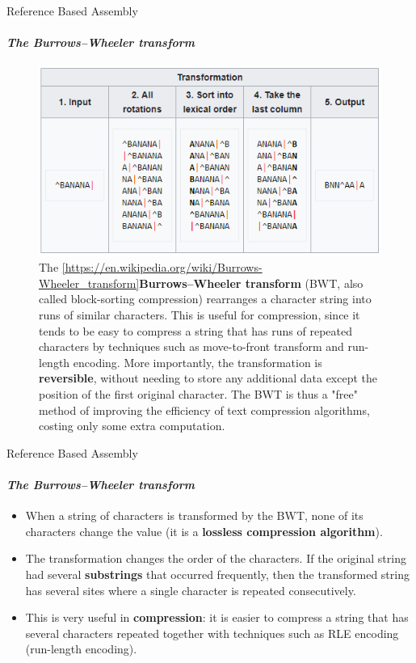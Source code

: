 \documentclass{if-beamer}
\begin{document}
\begin{frame}{Reference Based Assembly}
\framesubtitle{\emph{The Burrows–Wheeler transform}}
\begin{figure}
\centering
\includegraphics[scale=0.475]{bwt_banana.PNG}
\caption{The \cref{https://en.wikipedia.org/wiki/Burrows-Wheeler_transform}{\textbf{Burrows–Wheeler transform}} (BWT, also called block-sorting compression) rearranges a character string into runs of similar characters. This is useful for compression, since it tends to be easy to compress a string that has runs of repeated characters by techniques such as move-to-front transform and run-length encoding. More importantly, the transformation is \textbf{reversible}, without needing to store any additional data except the position of the first original character. The BWT is thus a "free" method of improving the efficiency of text compression algorithms, costing only some extra computation.}
\end{figure}
\end{frame}
\begin{frame}{Reference Based Assembly}
\framesubtitle{\emph{The Burrows–Wheeler transform}}
\begin{large}
\begin{itemize}
    \item When a string of characters is transformed by the BWT, none of its characters change the value (it is a \textbf{lossless compression algorithm}).
    \item The transformation changes the order of the characters. If the original string had several \textbf{substrings} that occurred frequently, then the transformed string has several sites where a single character is repeated consecutively.
    \item  This is very useful in \textbf{compression}: it is easier to compress a string that has several characters repeated together with techniques such as RLE encoding (run-length encoding).
\end{itemize} 
\end{large}
\end{frame}
\end{document}
